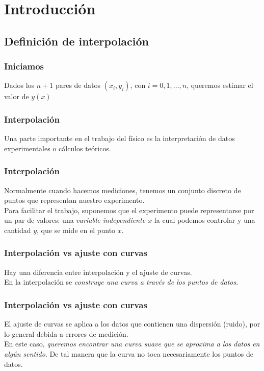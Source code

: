 \section{Introducción}
\subsection{Definición de interpolación}
\begin{frame}
\frametitle{Iniciamos}
Dados los $n+1$ pares de datos $(x_{i},y_{i})$, con $i=0,1,\ldots,n$, queremos estimar el valor de $y(x)$
\end{frame}
\begin{frame}
\frametitle{Interpolación}
Una parte importante en el trabajo del físico es la interpretación de datos experimentales o cálculos teóricos.
\end{frame}
\begin{frame}
\frametitle{Interpolación}
Normalmente cuando hacemos mediciones, tenemos un conjunto discreto de puntos que representan nuestro experimento.
\\
\bigskip
Para facilitar el trabajo, suponemos que el experimento puede representarse por un par de valores: una \textit{variable independiente $x$} la cual podemos controlar y una cantidad $y$, que se mide en el punto $x$.
\end{frame}
\begin{frame}
\frametitle{Interpolación vs ajuste con curvas}
Hay una diferencia entre interpolación y el ajuste de curvas.
\\
\bigskip
En la interpolación se \emph{construye una curva a través de los puntos de datos}.
\end{frame}
\begin{frame}
\frametitle{Interpolación vs ajuste con curvas}
El ajuste de curvas se aplica a los datos que contienen una dispersión (ruido), por lo general debida a errores de medición.
\\
\bigskip
En este caso, \emph{queremos encontrar una curva suave que se aproxima a los datos en algún sentido}. De tal manera que la curva no toca necesariamente los puntos de datos.
\end{frame}
